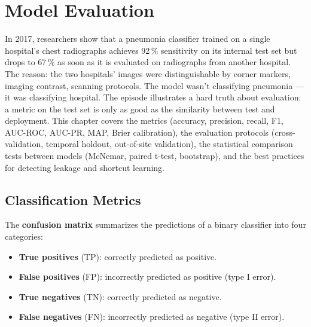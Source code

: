 \chapter{Model Evaluation}
\label{ch:evaluation}

In 2017, researchers show that a pneumonia classifier trained on a single hospital's chest radiographs achieves 92\,\% sensitivity on its internal test set but drops to 67\,\% as soon as it is evaluated on radiographs from another hospital. The reason: the two hospitals' images were distinguishable by corner markers, imaging contrast, scanning protocols. The model wasn't classifying pneumonia --- it was classifying hospital. The episode illustrates a hard truth about evaluation: a metric on the test set is only as good as the similarity between test and deployment. This chapter covers the metrics (accuracy, precision, recall, F1, AUC-ROC, AUC-PR, MAP, Brier calibration), the evaluation protocols (cross-validation, temporal holdout, out-of-site validation), the statistical comparison tests between models (McNemar, paired t-test, bootstrap), and the best practices for detecting leakage and shortcut learning.

\section{Classification Metrics}
\label{sec:metriques_classif}


\begin{definition}
The \textbf{confusion matrix} summarizes the predictions of a binary classifier into four categories:
\begin{itemize}
    \item \textbf{True positives} (TP): correctly predicted as positive.
    \item \textbf{False positives} (FP): incorrectly predicted as positive (type I error).
    \item \textbf{True negatives} (TN): correctly predicted as negative.
    \item \textbf{False negatives} (FN): incorrectly predicted as negative (type II error).
\end{itemize}
\end{definition}

